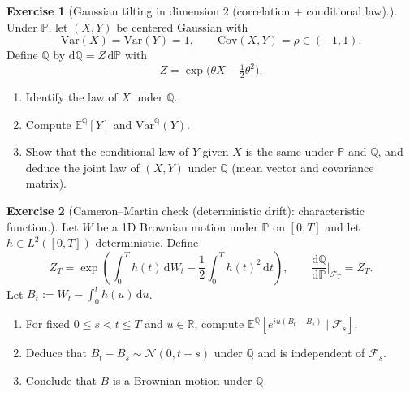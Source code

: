 \documentclass[11pt]{article}
\newcommand{\E}{\mathbb{E}}
\newcommand{\R}{\mathbb{R}}
\newcommand{\F}{\mathcal{F}}
\newcommand{\1}{\mathbf{1}}
\theoremstyle{definition}
\newtheorem{exercise}{Exercise}[section]
\begin{document}
\begin{exercise}[Gaussian tilting in dimension $2$ (correlation + conditional law).]
Under $\mathbb{P}$, let $(X,Y)$ be centered Gaussian with
$$
\text{Var}(X)=\text{Var}(Y)=1,\qquad \text{Cov}(X,Y)=\rho\in(-1,1).
$$
Define $\mathbb{Q}$ by $\mathrm{d}\mathbb{Q} = Z\,\mathrm{d}\mathbb{P}$ with
$$
Z=\exp\!\Big(\theta X-\tfrac12\theta^2\Big).
$$
\begin{enumerate}[leftmargin=1.2em, label=(\alph*), itemsep=0.3em]
\item Identify the law of $X$ under $\mathbb{Q}$.
\item Compute $\E^\mathbb{Q}[Y]$ and $\text{Var}^\mathbb{Q}(Y)$.
\item Show that the conditional law of $Y$ given $X$ is the same under $\mathbb{P}$ and $\mathbb{Q}$,
and deduce the joint law of $(X,Y)$ under $\mathbb{Q}$ (mean vector and covariance matrix).
\end{enumerate}
\end{exercise}
\begin{exercise}[Cameron--Martin check (deterministic drift): characteristic function.]
Let $W$ be a 1D Brownian motion under $\mathbb{P}$ on $[0,T]$ and let $h\in L^2([0,T])$ deterministic.
Define
$$
Z_T=\exp\!\left(\int_0^T h(t)\,\mathrm{d} W_t-\frac12\int_0^T h(t)^2\,\mathrm{d} t\right),
\qquad \frac{\mathrm{d}\mathbb{Q}}{\mathrm{d}\mathbb{P}}\Big|_{\F_T}=Z_T.
$$
Let $B_t:=W_t-\int_0^t h(u)\,\mathrm{d} u$.
\begin{enumerate}[leftmargin=1.2em, label=(\alph*), itemsep=0.3em]
\item For fixed $0\le s<t\le T$ and $u\in\R$, compute
$\E^\mathbb{Q}[e^{iu(B_t-B_s)}\mid \F_s]$.
\item Deduce that $B_t-B_s\sim \mathcal N(0,t-s)$ under $\mathbb{Q}$ and is independent of $\F_s$.
\item Conclude that $B$ is a Brownian motion under $\mathbb{Q}$.
\end{enumerate}
\end{exercise}
\end{document}
